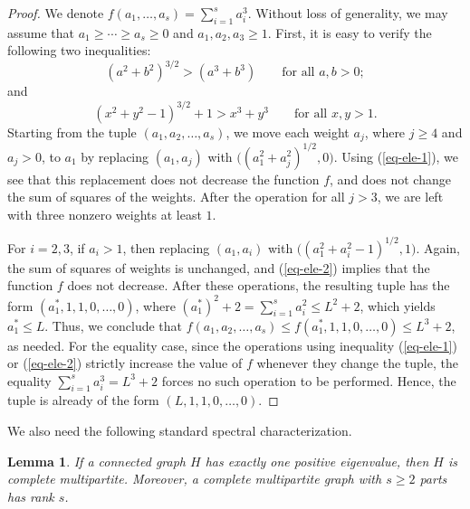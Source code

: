\documentclass[10pt,a4paper]{amsart}
\newtheorem{lemma}[theorem]{Lemma}
\renewcommand{\le}{\leqslant}
\renewcommand{\ge}{\geqslant}
\begin{document}
\begin{proof}
We denote $f(a_1,\ldots ,a_s)=\sum_{i=1}^s a_i^3$. 
    Without loss of generality, we may assume that 
    $a_1\ge \cdots \ge a_s\ge 0$ and $a_1,a_2,a_3\ge 1$. 
    First, it is easy to verify the following two inequalities: 
   \begin{equation} \label{eq-ele-1}
   (a^2+b^2)^{3/2} > (a^3+b^3) \qquad  \text{for all $a,b> 0$}; 
   \end{equation}
   and 
   \begin{equation} \label{eq-ele-2}
   (x^2+y^2-1)^{3/2} +1 > x^3+y^3 \qquad 
   \text{for all $x,y> 1$}.
   \end{equation}
   Starting from the tuple $(a_1,a_2,\ldots,a_s)$, we move each weight $a_j$, where $j\ge 4$ and $a_j >0$, to $a_1$ by replacing $(a_1,a_j)$ with $\big((a_1^2+a_j^2)^{1/2},0 \big)$. Using (\ref{eq-ele-1}), we see that this replacement 
   does not decrease the function $f$, and does not change the sum of squares of the weights. 
   After the operation for all $j>3$, we are left with three nonzero weights at least $1$. 

   
For $i=2,3$, if $a_i>1$, then replacing $(a_1,a_i)$ with 
$\big( (a_1^2+a_i^2 -1)^{1/2},1 \big)$. Again, the sum of squares of weights is unchanged, and (\ref{eq-ele-2}) implies that the function $f$ does not decrease. After these operations, the resulting tuple has the form $(a_1^*,1,1,0,\ldots ,0)$, where $(a_1^*)^2+2 =\sum_{i=1}^s a_i^2 \le L^2+2$, which yields $a_1^* \le L$. Thus, we conclude that $f(a_1,a_2,\ldots ,a_s)\le f(a_1^*,1,1,0,\ldots ,0)\le L^3+2$, as needed.  
For the equality case, since the operations using inequality (\ref{eq-ele-1}) or (\ref{eq-ele-2}) strictly increase the value of $f$ whenever they change the tuple, the equality $\sum_{i=1}^s a_i^3 =L^3+2$ forces no such operation to be performed. Hence, the tuple is already of the form $(L,1,1,0,\ldots ,0)$. 
\end{proof}


We also need the following standard spectral characterization.

\begin{lemma} \label{lem-one-positive}
If a connected graph $H$ has exactly one positive  eigenvalue, then $H$ is complete multipartite. Moreover, a complete multipartite graph with $s\ge 2$ parts has rank $s$. 
\end{lemma}
\end{document}
